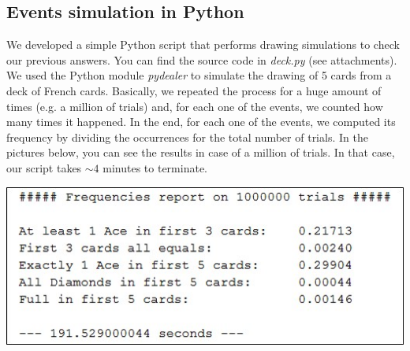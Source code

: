 \subsection{Events simulation in Python}
We developed a simple Python script that performs drawing simulations to check our previous answers. You can find the source code in \textit{deck.py} (see attachments).
We used the Python module \textit{pydealer}\cite{pydealer} to simulate the drawing of 5 cards from a deck of French cards. Basically, we repeated the process for a huge amount of times (e.g. a million of trials) and, for each one of the events, we counted how many times it happened.
In the end, for each one of the events, we computed its frequency by dividing the occurrences for the total number of trials.
In the pictures below, you can see the results in case of a million of trials. In that case, our script takes $\sim4$ minutes to terminate.

\begin{center}
	\includegraphics[]{img/deck.jpg}
\end{center}